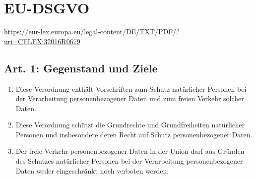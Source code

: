 \chapter{EU-DSGVO}
\newline
\url{https://eur-lex.europa.eu/legal-content/DE/TXT/PDF/?uri=CELEX:32016R0679}
    \section{Art. 1: Gegenstand und Ziele}
        \begin{enumerate}[label=(\arabic*)]
            \item Diese Verordnung enthält Vorschriften zum Schutz natürlicher Personen bei der Verarbeitung personenbezogener Daten und zum freien Verkehr solcher Daten.
            \item Diese Verordnung schützt die Grundrechte und Grundfreiheiten natürlicher Personen und insbesondere deren Recht auf Schutz personenbezogener Daten.
            \item Der freie Verkehr personenbezogener Daten in der Union darf aus Gründen des Schutzes natürlicher Personen bei der Verarbeitung personenbezogener Daten weder eingeschränkt noch verboten werden. 
        \end{enumerate}


